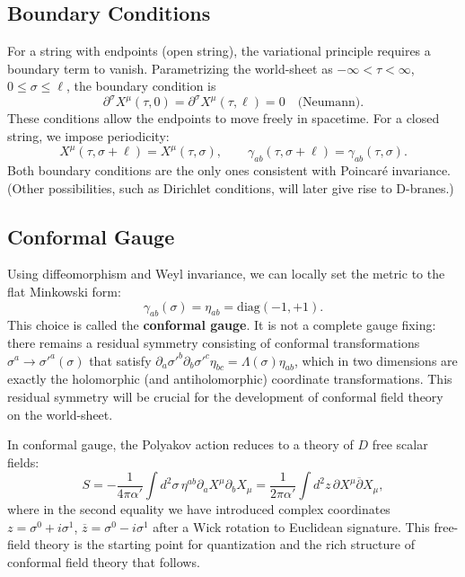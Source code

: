 \documentclass[11pt]{article}
\renewcommand{\bar}{\overline}
\begin{document}
\subsection{Boundary Conditions}

For a string with endpoints (open string), the variational principle requires a boundary term to vanish. Parametrizing the world-sheet as $-\infty < \tau < \infty$, $0 \le \sigma \le \ell$, the boundary condition is
\begin{equation}
\partial^\sigma X^\mu(\tau,0) = \partial^\sigma X^\mu(\tau,\ell) = 0 \quad \text{(Neumann)}.
\end{equation}
These conditions allow the endpoints to move freely in spacetime. For a closed string, we impose periodicity:
\begin{equation}
X^\mu(\tau, \sigma+\ell) = X^\mu(\tau,\sigma), \qquad \gamma_{ab}(\tau,\sigma+\ell) = \gamma_{ab}(\tau,\sigma).
\end{equation}
Both boundary conditions are the only ones consistent with Poincaré invariance. (Other possibilities, such as Dirichlet conditions, will later give rise to D-branes.)

\subsection{Conformal Gauge}

Using diffeomorphism and Weyl invariance, we can locally set the metric to the flat Minkowski form:
\begin{equation}
\gamma_{ab}(\sigma) = \eta_{ab} = \mathrm{diag}(-1, +1).
\end{equation}
This choice is called the \textbf{conformal gauge}. It is not a complete gauge fixing: there remains a residual symmetry consisting of conformal transformations $\sigma^a \to \sigma'^a(\sigma)$ that satisfy $\partial_a \sigma'^b \partial_b \sigma'^c \eta_{bc} = \Lambda(\sigma) \eta_{ab}$, which in two dimensions are exactly the holomorphic (and antiholomorphic) coordinate transformations. This residual symmetry will be crucial for the development of conformal field theory on the world-sheet.

In conformal gauge, the Polyakov action reduces to a theory of $D$ free scalar fields:
\begin{equation}
S = -\frac{1}{4\pi\alpha'} \int d^2\sigma \, \eta^{ab} \partial_a X^\mu \partial_b X_\mu = \frac{1}{2\pi\alpha'} \int d^2z \, \partial X^\mu \bar{\partial} X_\mu,
\end{equation}
where in the second equality we have introduced complex coordinates $z = \sigma^0 + i\sigma^1$, $\bar{z} = \sigma^0 - i\sigma^1$ after a Wick rotation to Euclidean signature. This free-field theory is the starting point for quantization and the rich structure of conformal field theory that follows.
\end{document}
